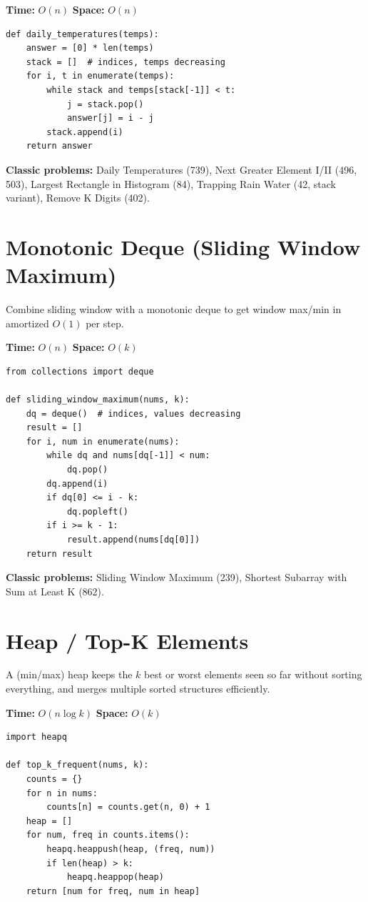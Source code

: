 \documentclass[11pt]{article}
\newcommand{\complexity}[2]{\textbf{Time:} #1 \quad \textbf{Space:} #2}
\begin{document}
\complexity{$O(n)$}{$O(n)$}

\begin{lstlisting}
def daily_temperatures(temps):
    answer = [0] * len(temps)
    stack = []  # indices, temps decreasing
    for i, t in enumerate(temps):
        while stack and temps[stack[-1]] < t:
            j = stack.pop()
            answer[j] = i - j
        stack.append(i)
    return answer
\end{lstlisting}

\textbf{Classic problems:} Daily Temperatures (739), Next Greater Element
I/II (496, 503), Largest Rectangle in Histogram (84), Trapping Rain Water
(42, stack variant), Remove K Digits (402).

\section{Monotonic Deque (Sliding Window Maximum)}

Combine sliding window with a monotonic deque to get window max/min in
amortized $O(1)$ per step.

\complexity{$O(n)$}{$O(k)$}

\begin{lstlisting}
from collections import deque

def sliding_window_maximum(nums, k):
    dq = deque()  # indices, values decreasing
    result = []
    for i, num in enumerate(nums):
        while dq and nums[dq[-1]] < num:
            dq.pop()
        dq.append(i)
        if dq[0] <= i - k:
            dq.popleft()
        if i >= k - 1:
            result.append(nums[dq[0]])
    return result
\end{lstlisting}

\textbf{Classic problems:} Sliding Window Maximum (239), Shortest
Subarray with Sum at Least K (862).

\section{Heap / Top-K Elements}

A (min/max) heap keeps the $k$ best or worst elements seen so far without
sorting everything, and merges multiple sorted structures efficiently.

\complexity{$O(n \log k)$}{$O(k)$}

\begin{lstlisting}
import heapq

def top_k_frequent(nums, k):
    counts = {}
    for n in nums:
        counts[n] = counts.get(n, 0) + 1
    heap = []
    for num, freq in counts.items():
        heapq.heappush(heap, (freq, num))
        if len(heap) > k:
            heapq.heappop(heap)
    return [num for freq, num in heap]
\end{lstlisting}
\end{document}

